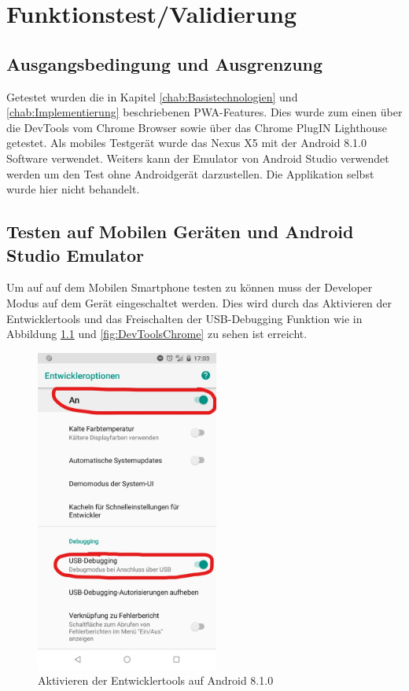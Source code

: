 \chapter{Funktionstest/Validierung}\label{chap:Funktionstest}
\thispagestyle{standard}
\pagestyle{standard}

\section{Ausgangsbedingung und Ausgrenzung}
Getestet wurden die in Kapitel \ref{chab:Basistechnologien} und \ref{chab:Implementierung} beschriebenen PWA-Features. Dies wurde zum einen über die DevTools vom Chrome Browser sowie über das Chrome PlugIN Lighthouse getestet. 
Als mobiles Testgerät wurde das Nexus X5 mit der Android 8.1.0 Software verwendet.  
Weiters kann der Emulator von Android Studio verwendet werden um den Test ohne Androidgerät darzustellen. Die Applikation selbst wurde hier nicht behandelt.
 
\section{Testen auf Mobilen Geräten und Android Studio Emulator}
Um auf auf dem Mobilen Smartphone testen zu können muss der Developer Modus auf dem Gerät eingeschaltet werden. Dies wird durch das Aktivieren der Entwicklertools und das Freischalten der USB-Debugging Funktion wie in Abbildung \ref{fig:DevToolsAndorid} und \ref{fig:DevToolsChrome} zu sehen ist erreicht. 

\begin{figure}[h]
	\centering
	\includegraphics[width=6cm]{BilderAllgemein/DevToolsAndroid}\medskip
	\caption{Aktivieren der Entwicklertools auf Android 8.1.0}
	\label{fig:DevToolsAndorid}
\end{figure}

